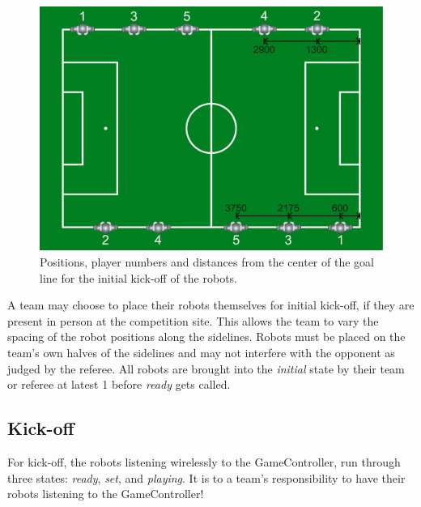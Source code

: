 \begin{figure}[t!]
	\begin{center}
		\leavevmode
		\includegraphics[width=1\columnwidth]{figs/initial_positions.pdf}
		\caption{Positions, player numbers and distances from the center of the goal line for the initial kick-off of the robots.}
		\label{fig:initial_positions}
	\end{center}
\end{figure}

A team may choose to place their robots themselves for initial kick-off, if they are present in person at the competition site. This allows the team to vary the spacing of the robot positions along the sidelines. Robots must be placed on the team's own halves of the sidelines and may not interfere with the opponent as judged by the referee. All robots are brought into the \textit{initial} state by their team or referee at latest \qty{1}{\min} before \textit{ready} gets called.

\subsection{Kick-off}
\label{sec:kick-off}
For kick-off, the robots listening wirelessly to the GameController, run through three states: \emph{ready}, \emph{set}, and \emph{playing}.
It is to a team's responsibility to have their robots listening to the GameController!

